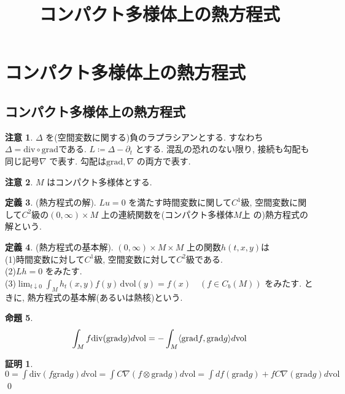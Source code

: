 \documentclass[10pt, fleqn, label-section=none]{bxjsarticle}
\title{コンパクト多様体上の熱方程式}
\author{}
\date{}
\theoremstyle{definition}
\newtheorem{dfn}{定義}[section]
\newtheorem{prop}[dfn]{命題}
\newtheorem*{pf*}{証明}
\newtheorem{remark}[dfn]{注意}
\newcommand{\tbra}[1]{\mleft\langle#1\mright\rangle}
\newcommand{\grad}{\textrm{grad}}
\renewcommand{\div}{\textrm{div}}
\newcommand{\vol}{\textrm{vol}}
\renewcommand{\d}{\, \textrm{d} }
\renewcommand{\-}{\hyphen}
\begin{document}
\maketitle

\scriptsize 


\section{コンパクト多様体上の熱方程式}
\subsection{コンパクト多様体上の熱方程式}
\begin{remark}
$\Delta$ を(空間変数に関する)負のラプラシアンとする. すなわち$\Delta = \div\circ \grad$である. $L \coloneqq \Delta - \partial_t$ とする. 混乱の恐れのない限り, 接続も勾配も同じ記号$\nabla$ で表す. 勾配は$\grad, \nabla$ の両方で表す. 
\end{remark}

\begin{remark}
$M$ はコンパクト多様体とする. 
\end{remark}

\begin{dfn}(熱方程式の解). $Lu = 0$ を満たす時間変数に関して$C^1$級, 空間変数に関して$C^2$級の$(0,\infty) \times M$ 上の連続関数を(コンパクト多様体$M$上 の)熱方程式の解という.
\end{dfn}

\begin{dfn}(熱方程式の基本解). $(0, \infty) \times M \times M$ 上の関数$h(t,x,y)$は\\
(1)時間変数に対して$C^1$級, 空間変数に対して$C^2$級である. \\
(2)$Lh = 0$ をみたす.\\
(3)$\lim_{t \downarrow 0} \int_M h_t(x,y)f(y) \d\vol(y) = f(x) \quad (f \in C_b (M))$ をみたす.
ときに, 熱方程式の基本解(あるいは熱核)という. 
\end{dfn}

\begin{prop}
\begin{align*}  \int_M f \div(\grad g) d \vol = - \int_M \tbra{\grad f, \grad g} d \vol \end{align*}
\end{prop}
\begin{pf*}
$0 = \int \div (f \grad g) d\vol = \int C \nabla (f \otimes \grad g) d \vol = \int df(\grad g) + f C \nabla (\grad g) d \vol $
\qed
\end{pf*}
\end{document}
